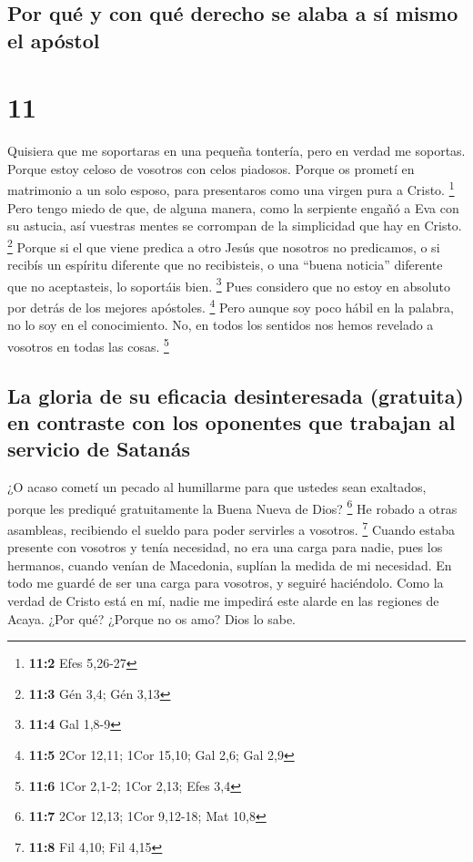 \hypertarget{por-quuxe9-y-con-quuxe9-derecho-se-alaba-a-suxed-mismo-el-apuxf3stol}{%
\subsection{Por qué y con qué derecho se alaba a sí mismo el
apóstol}\label{por-quuxe9-y-con-quuxe9-derecho-se-alaba-a-suxed-mismo-el-apuxf3stol}}

\hypertarget{section-10}{%
\section{11}\label{section-10}}

 Quisiera que me soportaras en una pequeña tontería, pero
en verdad me soportas.  Porque estoy celoso de vosotros
con celos piadosos. Porque os prometí en matrimonio a un solo esposo,
para presentaros como una virgen pura a Cristo. \footnote{\textbf{11:2}
  Efes 5,26-27}  Pero tengo miedo de que, de alguna
manera, como la serpiente engañó a Eva con su astucia, así vuestras
mentes se corrompan de la simplicidad que hay en Cristo. \footnote{\textbf{11:3}
  Gén 3,4; Gén 3,13}  Porque si el que viene predica a
otro Jesús que nosotros no predicamos, o si recibís un espíritu
diferente que no recibisteis, o una ``buena noticia'' diferente que no
aceptasteis, lo soportáis bien. \footnote{\textbf{11:4} Gal 1,8-9}
 Pues considero que no estoy en absoluto por detrás de los
mejores apóstoles. \footnote{\textbf{11:5} 2Cor 12,11; 1Cor 15,10; Gal
  2,6; Gal 2,9}  Pero aunque soy poco hábil en la palabra,
no lo soy en el conocimiento. No, en todos los sentidos nos hemos
revelado a vosotros en todas las cosas. \footnote{\textbf{11:6} 1Cor
  2,1-2; 1Cor 2,13; Efes 3,4}

\hypertarget{la-gloria-de-su-eficacia-desinteresada-gratuita-en-contraste-con-los-oponentes-que-trabajan-al-servicio-de-satanuxe1s}{%
\subsection{La gloria de su eficacia desinteresada (gratuita) en
contraste con los oponentes que trabajan al servicio de
Satanás}\label{la-gloria-de-su-eficacia-desinteresada-gratuita-en-contraste-con-los-oponentes-que-trabajan-al-servicio-de-satanuxe1s}}

 ¿O acaso cometí un pecado al humillarme para que ustedes
sean exaltados, porque les prediqué gratuitamente la Buena Nueva de
Dios? \footnote{\textbf{11:7} 2Cor 12,13; 1Cor 9,12-18; Mat 10,8}
 He robado a otras asambleas, recibiendo el sueldo para
poder servirles a vosotros. \footnote{\textbf{11:8} Fil 4,10; Fil 4,15}
 Cuando estaba presente con vosotros y tenía necesidad, no
era una carga para nadie, pues los hermanos, cuando venían de Macedonia,
suplían la medida de mi necesidad. En todo me guardé de ser una carga
para vosotros, y seguiré haciéndolo.  Como la verdad de
Cristo está en mí, nadie me impedirá este alarde en las regiones de
Acaya.  ¿Por qué? ¿Porque no os amo? Dios lo sabe.

